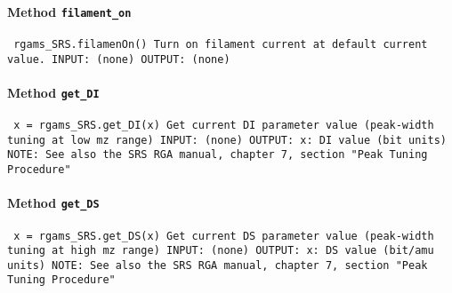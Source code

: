 \paragraph{Method \texttt{filament_on}}
\vspace{1ex}
\texttt{\newline
rgams_SRS.filamenOn()\newline
\newline
Turn on filament current at default current value.\newline
\newline
INPUT:\newline
(none)\newline
\newline
OUTPUT:\newline
(none)\newline
\newline
}

\paragraph{Method \texttt{get_DI}}
\vspace{1ex}
\texttt{\newline
x = rgams_SRS.get_DI(x)\newline
\newline
Get current DI parameter value (peak-width tuning at low mz range)\newline
\newline
INPUT:\newline
(none)\newline
\newline
OUTPUT:\newline
x: DI value (bit units)\newline
\newline
NOTE:\newline
See also the SRS RGA manual, chapter 7, section "Peak Tuning Procedure"\newline
\newline
}

\paragraph{Method \texttt{get_DS}}
\vspace{1ex}
\texttt{\newline
x = rgams_SRS.get_DS(x)\newline
\newline
Get current DS parameter value (peak-width tuning at high mz range)\newline
\newline
INPUT:\newline
(none)\newline
\newline
OUTPUT:\newline
x: DS value (bit/amu units)\newline
\newline
NOTE:\newline
See also the SRS RGA manual, chapter 7, section "Peak Tuning Procedure"\newline
\newline
}

